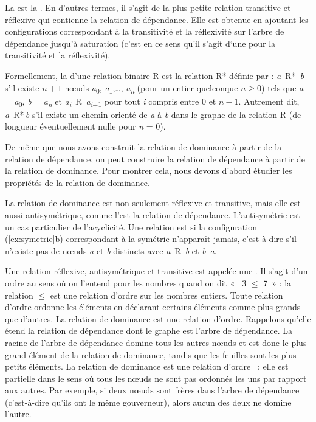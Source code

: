 {    La  est la . En d’autres termes, il s’agit de la plus petite relation transitive et réflexive qui contienne la relation de dépendance. Elle est obtenue en ajoutant les configurations correspondant à la transitivité et la réflexivité sur l’arbre de dépendance jusqu’à saturation (c’est en ce sens qu’il s’agit d‘une  pour la transitivité et la réflexivité).

    Formellement, la  d’une relation binaire R est la relation R* définie par : \textit{a~}R*\textit{~b} s’il existe $n+1$ nœuds \textit{a}\textsubscript{0}, \textit{a}\textsubscript{1},…, \textit{a\textsubscript{n}} (pour un entier quelconque $n \geq 0$) tels que \textit{a} = \textit{a}\textsubscript{0}, \textit{b} = \textit{a\textsubscript{n}} et \textit{a\textsubscript{i}}~R~\textit{a\textsubscript{i}}\textsubscript{+1} pour tout \textit{i} compris entre 0 et $n-1$. Autrement dit, \textit{a}~R*\,\textit{b} s’il existe un chemin orienté de \textit{a} à \textit{b} dans le graphe de la relation R (de longueur éventuellement nulle pour \textit{n} = 0).

    De même que nous avons construit la relation de dominance à partir de la relation de dépendance, on peut construire la relation de dépendance à partir de la relation de dominance. Pour montrer cela, nous devons d'abord étudier les propriétés de la relation de dominance. 
    
    La relation de dominance est non seulement réflexive et transitive, mais elle est aussi antisymétrique, comme l’est la relation de dépendance. L’antisymétrie est un cas particulier de l’acyclicité. Une relation est  si la configuration (\ref{ex:symetrie}b) correspondant à la symétrie n’apparaît jamais, c’est-à-dire s’il n’existe pas de nœuds \textit{a} et \textit{b} distincts avec \textit{a}~R~\textit{b} et \textit{b}~\textit{a}.

    Une relation réflexive, antisymétrique et transitive est appelée une . Il s’agit d’un ordre au sens où on l’entend pour les nombres quand on dit «~ 3 ${\leq}$ 7~» : la relation ${\leq}$ est une relation d’ordre sur les nombres entiers. Toute relation d’ordre ordonne les éléments en déclarant certains éléments comme plus grands que d’autres.
La relation de dominance est une relation d’ordre. Rappelons qu’elle étend la relation de dépendance dont le graphe est l’arbre de dépendance. La racine de l'arbre de dépendance domine tous les autres nœuds et est donc le plus grand élément de la relation de dominance, tandis que les feuilles sont les plus petits éléments. 
La relation de dominance est une relation d’ordre ~: elle est partielle dans le sens où tous les nœuds ne sont pas ordonnés les uns par rapport aux autres. Par exemple, si deux nœuds sont frères dans l’arbre de dépendance (c’est-à-dire qu’ils ont le même gouverneur), alors aucun des deux ne domine l’autre.

}
